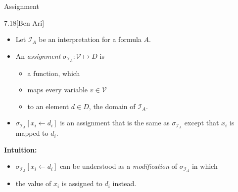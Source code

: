 \documentclass[style=sailor,size=12pt]{powerdot}
\begin{document}
\begin{wideslide}[bm=,toc=]{Assignment}
\begin{defn}{7.18}[Ben Ari]~\\
\begin{itemize}
\item<2-> Let $\mathcal{I}_A$ be an interpretation for a formula $A$. 
\item<3-> An \emph{assignment} $\sigma_{\mathcal{I}_A}: \mathcal{V} \mapsto D$ is 
\begin{itemize}
\item<4-> a function, which 
\item<5-> maps every variable $v \in \mathcal{V}$ 
\item<6-> to an element $d \in D$, the domain of $\mathcal{I}_A$.
\end{itemize}
\item<7-> $\sigma_{\mathcal{I}_A}[x_i \leftarrow d_i]$ is an assignment that is
the same as $\sigma_{\mathcal{I}_A}$ except that $x_i$ is mapped to
$d_i$.
\end{itemize}
\end{defn}
\pause[7]
\textbf{Intuition:}
\begin{itemize}
\item $\sigma_{\mathcal{I}_A}[x_i \leftarrow d_i]$ can be
understood as a \emph{modification} of $\sigma_{\mathcal{I}_A}$ in which 
\item the value of $x_i$ is assigned to $d_i$ instead.
\end{itemize}
\end{wideslide}
\end{document}
